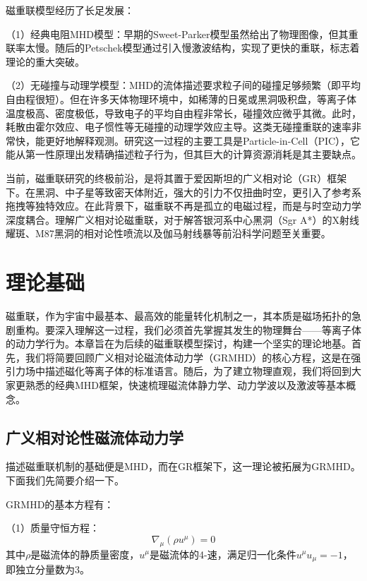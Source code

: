 \documentclass[lang=cn,color=blue,cm,11pt,scheme=chinese,bibend=bibtex,sorting=nty]{elegantbook}
\begin{document}
	磁重联模型经历了长足发展：
	
	（1）经典电阻MHD模型：早期的Sweet-Parker模型虽然给出了物理图像，但其重联率太慢。随后的Petschek模型通过引入慢激波结构，实现了更快的重联，标志着理论的重大突破。
	
	（2）无碰撞与动理学模型：MHD的流体描述要求粒子间的碰撞足够频繁（即平均自由程很短）。但在许多天体物理环境中，如稀薄的日冕或黑洞吸积盘，等离子体温度极高、密度极低，导致电子的平均自由程非常长，碰撞效应微乎其微。此时，耗散由霍尔效应、电子惯性等无碰撞的动理学效应主导。这类无碰撞重联的速率非常快，能更好地解释观测。研究这一过程的主要工具是Particle-in-Cell（PIC），它能从第一性原理出发精确描述粒子行为，但其巨大的计算资源消耗是其主要缺点。
	
	当前，磁重联研究的终极前沿，是将其置于爱因斯坦的广义相对论（GR）框架下。在黑洞、中子星等致密天体附近，强大的引力不仅扭曲时空，更引入了参考系拖拽等独特效应。在此背景下，磁重联不再是孤立的电磁过程，而是与时空动力学深度耦合。理解广义相对论磁重联，对于解答银河系中心黑洞（Sgr A*）的X射线耀斑、M87黑洞的相对论性喷流以及伽马射线暴等前沿科学问题至关重要。
	
	\tableofcontents
	
	\mainmatter
	
	\chapter{理论基础}
	
	磁重联，作为宇宙中最基本、最高效的能量转化机制之一，其本质是磁场拓扑的急剧重构。要深入理解这一过程，我们必须首先掌握其发生的物理舞台——等离子体的动力学行为。本章旨在为后续的磁重联模型探讨，构建一个坚实的理论地基。首先，我们将简要回顾广义相对论磁流体动力学（GRMHD）的核心方程，这是在强引力场中描述磁化等离子体的标准语言。随后，为了建立物理直观，我们将回到大家更熟悉的经典MHD框架，快速梳理磁流体静力学、动力学波以及激波等基本概念。
	
	\section{广义相对论性磁流体动力学}
	
	描述磁重联机制的基础便是MHD，而在GR框架下，这一理论被拓展为GRMHD。下面我们先简要介绍一下。
	
	GRMHD的基本方程有：
	
	（1）质量守恒方程：
	\begin{equation}
		\nabla_{\mu} (\rho u^{\mu}) = 0
	\end{equation}
	其中$\rho$是磁流体的静质量密度，$u^{\mu}$是磁流体的4-速，满足归一化条件$u^{\mu} u_{\mu} = - 1$，即独立分量数为3。
	
\end{document}
